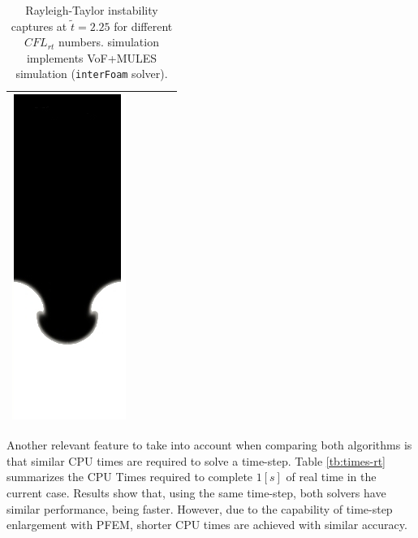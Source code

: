 \begin{table}[H]
\begin{center}
\begin{tabular}{m{} | >{\centering}m{} | >{\centering}m{} | >{\centering}m{} | m{} }
      \includegraphics[width=.17\columnwidth]{images/rayleigh_foam_dts_D.jpg}
      \\
      \hline
\end{tabular}
\caption{\label{fg:rayleigh-comparison-dts} Rayleigh-Taylor instability captures at $\widetilde{t}=2.25$ for different $CFL_{rt}$ numbers. \OF simulation implements VoF+MULES simulation  (\texttt{interFoam} solver).}
\end{center}
\end{table}
% 
% 
% 
% 

Another relevant feature to take into account when comparing both algorithms is that similar CPU times are required to solve a time-step.
Table \ref{tb:times-rt} summarizes the CPU Times required to complete $1[s]$ of real time in the current case. Results show that, using the same time-step, both solvers have similar performance, being \OF faster. However, due to the capability of time-step enlargement with PFEM, shorter CPU times are achieved with similar accuracy.

